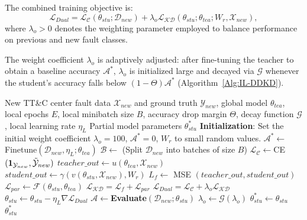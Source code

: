 The combined training objective is:
\begin{equation}
	{\mathcal L_{Dual}} = {\mathcal {L_C}}\left( {{\theta _{stu}};{{\mathscr D}_{new}}} \right) + {\lambda _o}{\mathcal {L_{KD}}}\left( {{\theta _{stu}};{\theta _{tea}};{W_r},{\mathcal X_{new}}} \right),
\end{equation}
where ${\lambda _o} > 0$ denotes the weighting parameter employed to balance performance on previous and new fault classes.

The weight coefficient $\lambda_o$ is adaptively adjusted: after fine-tuning the teacher to obtain a baseline accuracy $\mathcal{A}^*$, $\lambda_o$ is initialized large and decayed via $\mathcal{G}$ whenever the student's accuracy falls below $(1-\varTheta)\mathcal{A}^*$ (Algorithm~\ref{Alg:IL-DDKD}).

\begin{algorithm}[t]
	\caption{IL-DDKD Algorithm}
	\label{Alg:IL-DDKD}
	\begin{algorithmic}[1]
		\REQUIRE New TT\&C center fault data ${\mathcal X_{new}}$ and ground truth ${\mathcal Y_{new}}$, global model ${\theta _{tea}}$, local epochs $E$, local minibatch size $B$, accuracy drop margin $\Theta $, decay function $\mathcal G$, local learning rate $\eta_L $
		\ENSURE Partial model parameters $\theta _{{stu}}^ * $
		\STATE \textbf{Initialization}: Set the initial weight coefficient ${\lambda _o} = 100$, ${\mathcal A^ * } = 0$, ${W_r}$ to small random values.
		\STATE ${\mathcal A^ * } \leftarrow $Finetune$\left( {{{\mathscr D}_{new}},\eta_L ;{\theta _{tea}}} \right)$
		\STATE $\mathcal B \leftarrow $ (Split ${{\mathscr D}_{new}}$ into batches of size $B$)
		\STATE ${\mathcal {L_C}} \leftarrow $CE$ ( {{{\bf{1}}_{{\mathcal Y_{new}}}},{\mathcal{\tilde Y}_{new}}} )$
		\STATE $teacher\_out \leftarrow u\left( {{\theta _{tea}},{\mathcal X_{new}}} \right)$
		\STATE $student\_out \leftarrow \gamma \left( {v\left( {{\theta _{stu}},{\mathcal X_{new}}} \right),{W_r}} \right)$
		\STATE ${L_{f}} \leftarrow$ MSE $\left( {teacher\_out, student\_out} \right)$
		\STATE ${\mathcal L_{par}} \leftarrow \mathcal F\left( {{\theta _{stu}},{\theta _{tea}}} \right)$
		\STATE ${\mathcal{L_{KD}}} = {\mathcal L_{f}} + {\mathcal L_{par}}$
		\STATE ${\mathcal L_{Dual}} = {\mathcal {L_C}} + {\lambda _o}{\mathcal {L_{KD}}}$
		\STATE ${\theta _{stu}} \leftarrow {\theta _{stu}} - \eta_L \nabla {\mathcal L_{Dual}}$
		\ENDFOR
		\ENDFOR
		\STATE $\mathcal A \leftarrow $\textbf{Evaluate}$\left( {{{{\mathscr D}_{new}}};{\theta _{stu}}} \right)$
		\STATE ${\lambda _o} \leftarrow \mathcal G\left( {{\lambda _o}} \right)$
		\ENDIF
		\ENDWHILE
		\STATE $\theta _{{{stu}}}^ *  \leftarrow {\theta _{stu}}$
		\RETURN $\theta _{{{stu}}}^ * $
	\end{algorithmic}
\end{algorithm}

